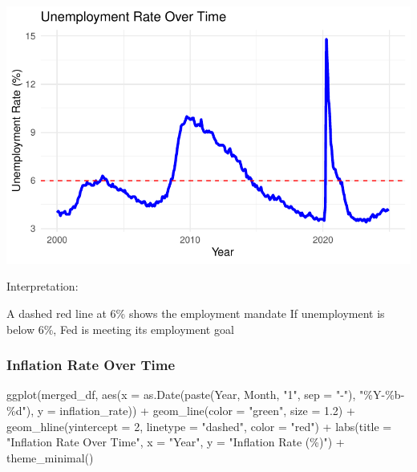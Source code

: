 \documentclass[
  letterpaper,
  DIV=11,
  numbers=noendperiod]{scrartcl}
\newenvironment{Shaded}{\begin{snugshade}}{\end{snugshade}}
\newcommand{\AttributeTok}[1]{\textcolor[rgb]{0.40,0.45,0.13}{#1}}
\newcommand{\DecValTok}[1]{\textcolor[rgb]{0.68,0.00,0.00}{#1}}
\newcommand{\FloatTok}[1]{\textcolor[rgb]{0.68,0.00,0.00}{#1}}
\newcommand{\FunctionTok}[1]{\textcolor[rgb]{0.28,0.35,0.67}{#1}}
\newcommand{\NormalTok}[1]{\textcolor[rgb]{0.00,0.23,0.31}{#1}}
\newcommand{\SpecialCharTok}[1]{\textcolor[rgb]{0.37,0.37,0.37}{#1}}
\newcommand{\StringTok}[1]{\textcolor[rgb]{0.13,0.47,0.30}{#1}}
\begin{document}
\includegraphics{Assignment2_Data608_Quarto_files/figure-pdf/unnamed-chunk-26-1.pdf}

Interpretation:

A dashed red line at 6\% shows the employment mandate If unemployment is
below 6\%, Fed is meeting its employment goal

\subsubsection{Inflation Rate Over Time}\label{inflation-rate-over-time}

\begin{Shaded}
\begin{Highlighting}[]
\FunctionTok{ggplot}\NormalTok{(merged\_df, }\FunctionTok{aes}\NormalTok{(}\AttributeTok{x =} \FunctionTok{as.Date}\NormalTok{(}\FunctionTok{paste}\NormalTok{(Year, Month, }\StringTok{"1"}\NormalTok{, }\AttributeTok{sep =} \StringTok{"{-}"}\NormalTok{), }\StringTok{"\%Y{-}\%b{-}\%d"}\NormalTok{), }\AttributeTok{y =}\NormalTok{ inflation\_rate)) }\SpecialCharTok{+}
  \FunctionTok{geom\_line}\NormalTok{(}\AttributeTok{color =} \StringTok{"green"}\NormalTok{, }\AttributeTok{size =} \FloatTok{1.2}\NormalTok{) }\SpecialCharTok{+}
  \FunctionTok{geom\_hline}\NormalTok{(}\AttributeTok{yintercept =} \DecValTok{2}\NormalTok{, }\AttributeTok{linetype =} \StringTok{"dashed"}\NormalTok{, }\AttributeTok{color =} \StringTok{"red"}\NormalTok{) }\SpecialCharTok{+}
  \FunctionTok{labs}\NormalTok{(}\AttributeTok{title =} \StringTok{"Inflation Rate Over Time"}\NormalTok{,}
       \AttributeTok{x =} \StringTok{"Year"}\NormalTok{, }
       \AttributeTok{y =} \StringTok{"Inflation Rate (\%)"}\NormalTok{) }\SpecialCharTok{+}
  \FunctionTok{theme\_minimal}\NormalTok{()}
\end{Highlighting}
\end{Shaded}
\end{document}
